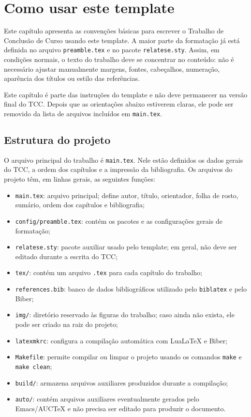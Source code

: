 \chapter{Como usar este template}
\label{chap:uso_template}

Este capítulo apresenta as convenções básicas para escrever o Trabalho de Conclusão de Curso usando este template. A maior parte da formatação já está definida no arquivo \verb|preamble.tex| e no pacote \verb|relatese.sty|. Assim, em condições normais, o texto do trabalho deve se concentrar no conteúdo: não é necessário ajustar manualmente margens, fontes, cabeçalhos, numeração, aparência dos títulos ou estilo das referências.

Este capítulo é parte das instruções do template e não deve permanecer na versão final do TCC. Depois que as orientações abaixo estiverem claras, ele pode ser removido da lista de arquivos incluídos em \verb|main.tex|.

\section{Estrutura do projeto}
\label{sec:estrutura_projeto}

O arquivo principal do trabalho é \verb|main.tex|. Nele estão definidos os dados gerais do TCC, a ordem dos capítulos e a impressão da bibliografia. Os arquivos do projeto têm, em linhas gerais, as seguintes funções:

\begin{itemize}
\item \verb|main.tex|: arquivo principal; define autor, título, orientador, folha de rosto, sumário, ordem dos capítulos e bibliografia;
\item \verb|config/preamble.tex|: contém os pacotes e as configurações gerais de formatação;
\item \verb|relatese.sty|: pacote auxiliar usado pelo template; em geral, não deve ser editado durante a escrita do TCC;
\item \verb|tex/|: contém um arquivo \verb|.tex| para cada capítulo do trabalho;
\item \verb|references.bib|: banco de dados bibliográficos utilizado pelo \verb|biblatex| e pelo Biber;
\item \verb|img/|: diretório reservado às figuras do trabalho; caso ainda não exista, ele pode ser criado na raiz do projeto;
\item \verb|latexmkrc|: configura a compilação automática com LuaLaTeX e Biber;
\item \verb|Makefile|: permite compilar ou limpar o projeto usando os comandos \verb|make| e \verb|make clean|;
\item \verb|build/|: armazena arquivos auxiliares produzidos durante a compilação;
\item \verb|auto/|: contém arquivos auxiliares eventualmente gerados pelo Emacs/AUCTeX e não precisa ser editado para produzir o documento.
\end{itemize}

